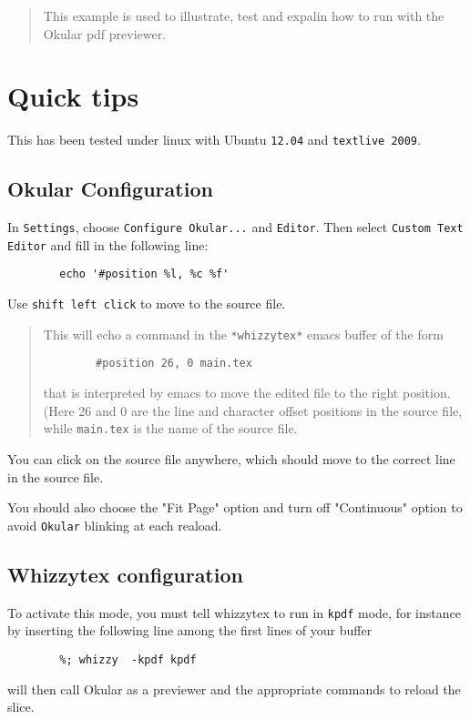 \documentclass{article}
\begin{document}
\begin{abstract}
This example is used to illustrate, test and expalin how to run {\WhizzyTeX}
with the Okular pdf previewer. 
\end{abstract}

\tableofcontents

\section{Quick tips}

This has been tested under linux with Ubuntu \verb"12.04"
and \verb"textlive 2009".

\subsection{Okular Configuration}


In \verb"Settings", choose \verb"Configure Okular..."  and \verb"Editor".
Then select \verb"Custom Text Editor" and fill in the following line:
\begin{verbatim}
        echo '#position %l, %c %f'
\end{verbatim}
Use \texttt{shift left click} to move to the source file.
\begin{quote}\small
This will echo a command in the \verb"*whizzytex*" emacs buffer of the form
\begin{verbatim}
        #position 26, 0 main.tex
\end{verbatim}
that is interpreted by emacs to move the edited file to the right position.
(Here 26 and 0 are the line and character offset positions in the source
file, while \verb"main.tex" is the name of the source file.
\end{quote}
You can click on the source file anywhere, which should move to the 
correct line in the source file.

You should also choose the "Fit Page" option and turn off "Continuous" 
option to avoid \texttt{Okular} blinking at each reaload.

\subsection{Whizzytex configuration}

To activate this mode, you must tell whizzytex to run in \texttt{kpdf} mode,
for instance by inserting the following line among the first lines of your
buffer 
\begin{verbatim}
        %; whizzy  -kpdf kpdf
\end{verbatim}
{\WhizzyTeX} will then call Okular as a previewer and the appropriate 
commands to reload the slice.
\end{document}
